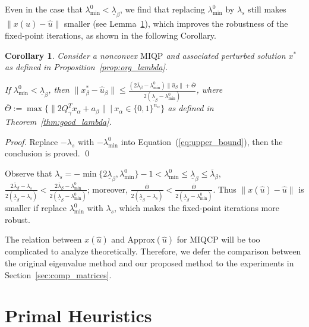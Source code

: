 \documentclass[]{article}
\newtheorem{corollary}{Corollary}
\begin{document}
Even in the case that $\lambda_{\min}^0<\underline{\lambda}_\beta$, we find that replacing $\lambda_{\min}^0$ by $\lambda_s$ still makes $\|x(\hat{u}) - \hat{u}\|$ smaller (see Lemma~\ref{cor:la_s}), which improves the robustness of the fixed-point iterations, as shown in the following Corollary.

\begin{corollary}\label{cor:la_s}
    Consider a nonconvex $\mathrm{MIQP}$ and associated perturbed solution $x^*$ as defined in Proposition~\ref{prop:org_lambda}.
    
    If $\lambda_{\min}^0 <\underline{\lambda}_\beta$, then
    $\|x_\beta^*-\hat{u}_\beta\| \leq \frac{(2\overline{\lambda}_\beta -\lambda_{\min}^0)\|\hat{u}_\beta\| + \overline{\Theta}}{2(\underline{\lambda}_\beta -\lambda_{\min}^0)}$, where $\overline{\Theta}:=\max\{\|2Q_\gamma^T x_\alpha + a_\beta\|\ |\ x_\alpha\in\{0,1\}^{n_\alpha}\}$ as defined in Theorem~\ref{thm:good_lambda}.
\end{corollary}

\begin{proof}
    Replace $-\lambda_s$ with $-\lambda_{\min}^0$ into Equation~(\ref{eq:upper_bound}), then the conclusion is proved. \qed
\end{proof}

Observe that $\lambda_s = -\min\{2\underline{\lambda}_\beta, \lambda_{\min}^0\} - 1 < \lambda_{\min}^0 \leq \underline{\lambda}_\beta \leq \overline{\lambda}_\beta$, $\frac{2\overline{\lambda}_\beta - \lambda_s}{2(\underline{\lambda}_\beta - \lambda_s)} < \frac{2\overline{\lambda}_\beta - \lambda_{\min}^0}{2(\underline{\lambda}_\beta - \lambda_{\min}^0)}$; moreover, $\frac{\overline{\Theta}}{2(\underline{\lambda}_\beta - \lambda_s)} < \frac{\overline{\Theta}}{2(\underline{\lambda}_\beta - \lambda_{\min}^0)}$. Thus $\|x(\hat{u}) - \hat{u}\|$ is smaller if replace $\lambda_{\min}^0$ with $\lambda_s$, which makes the fixed-point iterations more robust.


The relation between $x(\hat{u})$ and $\mbox{Approx}(\hat{u})$ for MIQCP will be too complicated to analyze theoretically. Therefore, we defer the comparison between the original eigenvalue method and our proposed method to the experiments in Section~\ref{sec:comp_matrices}.


\section{Primal Heuristics}\label{sec:primal_heuristics}
\end{document}
